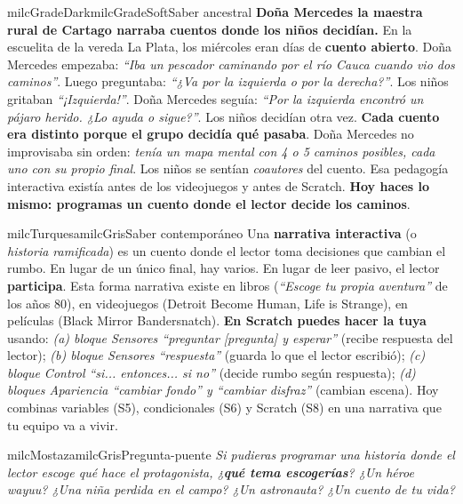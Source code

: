 \documentclass[11pt,letterpaper]{article}
\begin{document}
\begin{softbox}{milcGradeDark}{milcGradeSoft}{Saber ancestral}
\textbf{Doña Mercedes la maestra rural de Cartago narraba cuentos donde los niños decidían.} En la escuelita de la vereda La Plata, los miércoles eran días de \textbf{cuento abierto}. Doña Mercedes empezaba: \emph{``Iba un pescador caminando por el río Cauca cuando vio dos caminos''}. Luego preguntaba: \emph{``¿Va por la izquierda o por la derecha?''}. Los niños gritaban \emph{``¡Izquierda!''}. Doña Mercedes seguía: \emph{``Por la izquierda encontró un pájaro herido. ¿Lo ayuda o sigue?''}. Los niños decidían otra vez. \textbf{Cada cuento era distinto porque el grupo decidía qué pasaba}. Doña Mercedes no improvisaba sin orden: \emph{tenía un mapa mental con 4 o 5 caminos posibles, cada uno con su propio final}. Los niños se sentían \emph{coautores} del cuento. Esa pedagogía interactiva existía antes de los videojuegos y antes de Scratch. \textbf{Hoy haces lo mismo: programas un cuento donde el lector decide los caminos}.
\end{softbox}

\begin{softbox}{milcTurquesa}{milcGris}{Saber contemporáneo}
Una \textbf{narrativa interactiva} (o \emph{historia ramificada}) es un cuento donde el lector toma decisiones que cambian el rumbo. En lugar de un único final, hay varios. En lugar de leer pasivo, el lector \textbf{participa}. Esta forma narrativa existe en libros (\emph{``Escoge tu propia aventura''} de los años 80), en videojuegos (Detroit Become Human, Life is Strange), en películas (Black Mirror Bandersnatch). \textbf{En Scratch puedes hacer la tuya} usando: \emph{(a) bloque Sensores ``preguntar [pregunta] y esperar''} (recibe respuesta del lector); \emph{(b) bloque Sensores ``respuesta''} (guarda lo que el lector escribió); \emph{(c) bloque Control ``si... entonces... si no''} (decide rumbo según respuesta); \emph{(d) bloques Apariencia ``cambiar fondo'' y ``cambiar disfraz''} (cambian escena). Hoy combinas variables (S5), condicionales (S6) y Scratch (S8) en una narrativa que tu equipo va a vivir.
\end{softbox}

\begin{softbox}{milcMostaza}{milcGris}{Pregunta-puente}
\textit{Si pudieras programar una historia donde el lector escoge qué hace el protagonista, ¿\textbf{qué tema escogerías}? ¿Un héroe wayuu? ¿Una niña perdida en el campo? ¿Un astronauta? ¿Un cuento de tu vida?}
\end{softbox}
\end{document}
